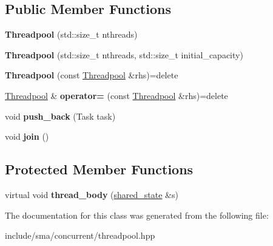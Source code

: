 \subsection*{Public Member Functions}
\begin{DoxyCompactItemize}
\item 
\hypertarget{classsma_1_1Threadpool_aa560424f9db36f20cb4c299ab5902036}{{\bfseries Threadpool} (std\-::size\-\_\-t nthreads)}\label{classsma_1_1Threadpool_aa560424f9db36f20cb4c299ab5902036}

\item 
\hypertarget{classsma_1_1Threadpool_abd0d5ae54f958eed0d02e1c6bd1cd8ce}{{\bfseries Threadpool} (std\-::size\-\_\-t nthreads, std\-::size\-\_\-t initial\-\_\-capacity)}\label{classsma_1_1Threadpool_abd0d5ae54f958eed0d02e1c6bd1cd8ce}

\item 
\hypertarget{classsma_1_1Threadpool_aaa530944d32a7c297b91f395300cf5fc}{{\bfseries Threadpool} (const \hyperlink{classsma_1_1Threadpool}{Threadpool} \&rhs)=delete}\label{classsma_1_1Threadpool_aaa530944d32a7c297b91f395300cf5fc}

\item 
\hypertarget{classsma_1_1Threadpool_ad4ade558d34d0fd7bbf8414cc258274c}{\hyperlink{classsma_1_1Threadpool}{Threadpool} \& {\bfseries operator=} (const \hyperlink{classsma_1_1Threadpool}{Threadpool} \&rhs)=delete}\label{classsma_1_1Threadpool_ad4ade558d34d0fd7bbf8414cc258274c}

\item 
\hypertarget{classsma_1_1Threadpool_a573decbf54e79e9387c8086aca71b8ad}{void {\bfseries push\-\_\-back} (Task task)}\label{classsma_1_1Threadpool_a573decbf54e79e9387c8086aca71b8ad}

\item 
\hypertarget{classsma_1_1Threadpool_af7d5ce846a02d9dd7b4bd8fb44480fbf}{void {\bfseries join} ()}\label{classsma_1_1Threadpool_af7d5ce846a02d9dd7b4bd8fb44480fbf}

\end{DoxyCompactItemize}
\subsection*{Protected Member Functions}
\begin{DoxyCompactItemize}
\item 
\hypertarget{classsma_1_1Threadpool_a66bd499e0727debce853cbb58f933739}{virtual void {\bfseries thread\-\_\-body} (\hyperlink{structsma_1_1Threadpool_1_1shared__state}{shared\-\_\-state} \&s)}\label{classsma_1_1Threadpool_a66bd499e0727debce853cbb58f933739}

\end{DoxyCompactItemize}


The documentation for this class was generated from the following file\-:\begin{DoxyCompactItemize}
\item 
include/sma/concurrent/threadpool.\-hpp\end{DoxyCompactItemize}
